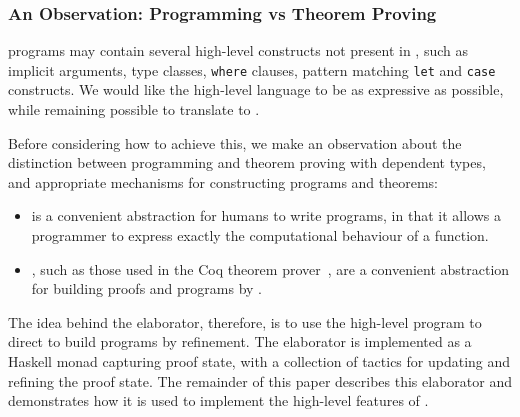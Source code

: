
\subsubsection{An Observation: Programming vs Theorem Proving}

\Idris{} programs may contain several high-level constructs not present in \TT{}, such
as implicit arguments, type classes, \texttt{where} clauses, pattern matching \texttt{let}
and \texttt{case} constructs. We would like the high-level language to be as expressive
as possible, while remaining possible to translate to \TT{}.

Before considering how to achieve this, we make an observation about the distinction between
programming and theorem proving with dependent types, and appropriate mechanisms for
constructing programs and theorems:

\begin{itemize}
\item {} is a convenient abstraction for humans to write
programs, in that it allows a programmer to express exactly the computational
behaviour of a function.
\item {}, such as those used in the Coq theorem
prover~\cite{Bertot2004}, are a convenient abstraction for building proofs and
programs by .
\end{itemize}

The idea behind the \Idris{} elaborator, therefore, is to use the high-level
program to direct  to build \TT{} programs by refinement.  The
elaborator is implemented as a Haskell monad capturing proof state, with a
collection of tactics for updating and refining the proof state.  The remainder
of this paper describes this elaborator and demonstrates how it is used to
implement the high-level features of \Idris{}.



